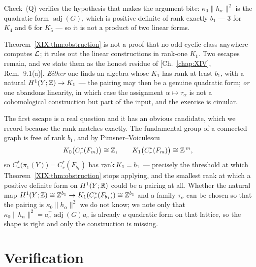 Check~(Q) verifies the hypothesis that makes the argument bite: $\kappa_0\|h_\alpha\|^2$
is the quadratic form $\operatorname{adj}(G)$, which is positive definite of rank exactly
$b_1$ --- $3$ for $K_4$ and $6$ for $K_5$ --- so it is not a product of two linear forms.

\begin{remark}\label{XIX:rem:needed}
Theorem~\ref{XIX:thm:obstruction} is not a proof that no odd cyclic class anywhere computes
$\mathcal{L}$; it rules out the linear constructions in rank-one $K_1$. Two escapes remain, and we
state them as the honest residue of [Ch.~\ref{chap:XIV}, Rem.~9.1(a)]. \emph{Either} one finds an algebra
whose $K_1$ has rank at least $b_1$, with a natural $H^1(Y;\mathbb{Z})\to K_1$ --- the pairing may
then be a genuine quadratic form; \emph{or} one abandons linearity, in which case the
assignment $\alpha\mapsto\tau_\alpha$ is not a cohomological construction but part of the
input, and the exercise is circular.

The first escape is a real question and it has an obvious candidate, which we record
because the rank matches exactly. The fundamental group of a connected graph is free of
rank $b_1$, and by Pimsner--Voiculescu
\[
K_0\bigl(C^*_r(F_m)\bigr)\cong\mathbb{Z},\qquad K_1\bigl(C^*_r(F_m)\bigr)\cong\mathbb{Z}^{\,m},
\]
so $C^*_r\bigl(\pi_1(Y)\bigr)=C^*_r(F_{b_1})$ has $\operatorname{rank} K_1=b_1$ --- precisely the
threshold at which Theorem~\ref{XIX:thm:obstruction} stops applying, and the smallest rank at
which a positive definite form on $H^1(Y;\mathbb{R})$ could be a pairing at all. Whether the
natural map $H^1(Y;\mathbb{Z})\cong\mathbb{Z}^{b_1}\to K_1(C^*_r(F_{b_1}))\cong\mathbb{Z}^{b_1}$ and a family
$\tau_\alpha$ can be chosen so that the pairing is $\kappa_0\|h_\alpha\|^2$ we do not
know; we note only that $\kappa_0\|h_\alpha\|^2=a_c^{\mathsf T}\operatorname{adj}(G)a_c$ is
already \emph{a} quadratic form on that lattice, so the shape is right and only the
construction is missing.
\end{remark}

\section{Verification}\label{XIX:sec:battery}

